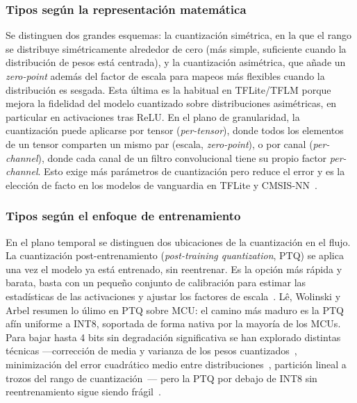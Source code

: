 \documentclass[a4paper,12pt,twoside,final]{book}
\begin{document}
\subsubsection{Tipos según la representación matemática}
Se distinguen dos grandes esquemas: la cuantización simétrica, en la que el rango se distribuye simétricamente
alrededor de cero (más simple, suficiente cuando la distribución de pesos está centrada), y la cuantización
asimétrica, que añade un \textit{zero-point} además del factor de escala para mapeos más flexibles cuando la
distribución es sesgada. Esta última es la habitual en TFLite/TFLM porque mejora la fidelidad del modelo cuantizado
sobre distribuciones asimétricas, en particular en activaciones tras ReLU. En el plano de granularidad, la
cuantización puede aplicarse por tensor (\textit{per-tensor}), donde todos los elementos de un tensor comparten un
mismo par (escala, \textit{zero-point}), o por canal (\textit{per-channel}), donde cada canal de un filtro
convolucional tiene su propio factor \textit{per-channel}. Esto exige más parámetros de cuantización pero reduce el
error y es la elección de facto en los modelos de vanguardia en TFLite y CMSIS-NN~\cite{novac2021sensors}.

\subsubsection{Tipos según el enfoque de entrenamiento}
En el plano temporal se distinguen dos ubicaciones de la cuantización en el flujo. La cuantización post-entrenamiento
(\textit{post-training quantization}, PTQ) se aplica una vez el modelo ya está entrenado, sin reentrenar. Es la
opción más rápida y barata, basta con un pequeño conjunto de calibración para estimar las estadísticas de las
activaciones y ajustar los factores de escala~\cite{lê2025tist,liang2021neucom}. Lê, Wolinski y Arbel resumen lo
úlimo en PTQ sobre MCU: el camino más maduro es la PTQ afín uniforme a INT8, soportada de forma nativa por la mayoría
de los MCUs. Para bajar hasta 4 bits sin degradación significativa se han explorado distintas técnicas ---corrección
de media y varianza de los pesos cuantizados~\cite{banner2019nips,gholami2022lowpowercv}, minimización del
error cuadrático medio entre distribuciones~\cite{choukroun2019niccvw}, partición lineal a trozos del rango de
cuantización~\cite{fang2020eccv}--- pero la PTQ por debajo de INT8 sin reentrenamiento sigue siendo
frágil~\cite{lê2025tist}.\\
\end{document}

